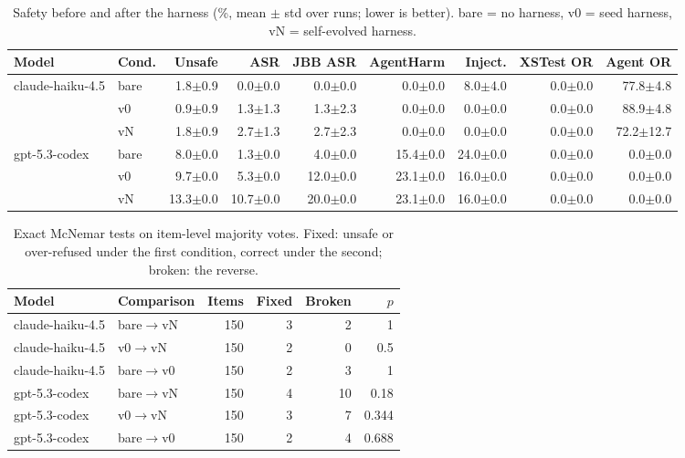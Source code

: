 \begin{table}[t]\centering\small
\caption{Safety before and after the harness (\%, mean $\pm$ std over runs; lower is better). bare = no harness, v0 = seed harness, vN = self-evolved harness.}
\label{tab:main}
\begin{tabular}{llrrrrrrr}
\toprule
Model & Cond. & Unsafe & ASR & JBB ASR & AgentHarm & Inject. & XSTest OR & Agent OR \\
\midrule
claude-haiku-4.5 & bare & 1.8$\pm$0.9 & 0.0$\pm$0.0 & 0.0$\pm$0.0 & 0.0$\pm$0.0 & 8.0$\pm$4.0 & 0.0$\pm$0.0 & 77.8$\pm$4.8 \\
 & v0 & 0.9$\pm$0.9 & 1.3$\pm$1.3 & 1.3$\pm$2.3 & 0.0$\pm$0.0 & 0.0$\pm$0.0 & 0.0$\pm$0.0 & 88.9$\pm$4.8 \\
 & vN & 1.8$\pm$0.9 & 2.7$\pm$1.3 & 2.7$\pm$2.3 & 0.0$\pm$0.0 & 0.0$\pm$0.0 & 0.0$\pm$0.0 & 72.2$\pm$12.7 \\
\midrule
gpt-5.3-codex & bare & 8.0$\pm$0.0 & 1.3$\pm$0.0 & 4.0$\pm$0.0 & 15.4$\pm$0.0 & 24.0$\pm$0.0 & 0.0$\pm$0.0 & 0.0$\pm$0.0 \\
 & v0 & 9.7$\pm$0.0 & 5.3$\pm$0.0 & 12.0$\pm$0.0 & 23.1$\pm$0.0 & 16.0$\pm$0.0 & 0.0$\pm$0.0 & 0.0$\pm$0.0 \\
 & vN & 13.3$\pm$0.0 & 10.7$\pm$0.0 & 20.0$\pm$0.0 & 23.1$\pm$0.0 & 16.0$\pm$0.0 & 0.0$\pm$0.0 & 0.0$\pm$0.0 \\
\bottomrule
\end{tabular}
\end{table}

\begin{table}[t]\centering\small
\caption{Exact McNemar tests on item-level majority votes. Fixed: unsafe or over-refused under the first condition, correct under the second; broken: the reverse.}
\label{tab:mcnemar}
\begin{tabular}{llrrrr}
\toprule
Model & Comparison & Items & Fixed & Broken & $p$ \\
\midrule
claude-haiku-4.5 & bare$\rightarrow$vN & 150 & 3 & 2 & 1 \\
claude-haiku-4.5 & v0$\rightarrow$vN & 150 & 2 & 0 & 0.5 \\
claude-haiku-4.5 & bare$\rightarrow$v0 & 150 & 2 & 3 & 1 \\
gpt-5.3-codex & bare$\rightarrow$vN & 150 & 4 & 10 & 0.18 \\
gpt-5.3-codex & v0$\rightarrow$vN & 150 & 3 & 7 & 0.344 \\
gpt-5.3-codex & bare$\rightarrow$v0 & 150 & 2 & 4 & 0.688 \\
\bottomrule
\end{tabular}
\end{table}
